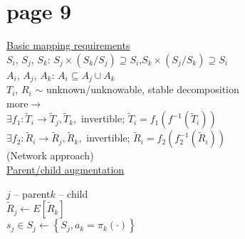 \section*{page 9}

\underline{Basic mapping requirements}\\

$S_i$, $S_j$, $S_k$: \quad $S_j \times (S_k/S_j)  \supseteq S_i$,\quad $S_k \times (S_j/S_k) \supseteq S_i$\\

$A_i$, $A_j$, $A_k$: \quad $A_i \subseteq A_j\cup A_k$\\

$T_i$, $R_i$ $\sim$ unknown/unknowable, stable decomposition\\


more$\longrightarrow$
\\

$\exists f_1:\tilde{T}_i\to \tilde{T}_j, \tilde{T}_k$,\ invertible; $\tilde{T}_i = f_1\left(f^{-1}\left(\tilde{T}_i\right)\right)$\\
$\exists f_2:\tilde{R}_i\to \tilde{R}_j, \tilde{R}_k$,\ invertible; $\tilde{R}_i = f_2\left(f_2^{-1}\left(\tilde{R}_i\right)\right)$\\

(Network approach)\\
\underline{Parent/child augmentation}\\

\begin{minipage}{\textwidth}

\begin{minipage}{0.4\textwidth}
$j$ -- parent\quad $k$ -- child\\
$\tilde{R}_j\leftarrow E[\tilde{R}_k]$\\
$s_j\in S_j \leftarrow \left\{S_j, a_k=\pi_k(\cdot)\right\}$\\

\end{minipage}
\end{minipage}


